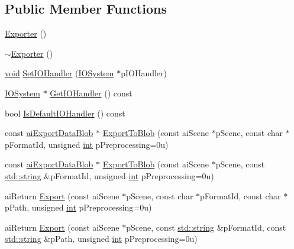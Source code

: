 \subsection*{Public Member Functions}
\begin{DoxyCompactItemize}
\item 
\hyperlink{class_assimp_1_1_exporter_ac45a55fc178256576d2d21b58bd944a0}{Exporter} ()
\item 
\hyperlink{class_assimp_1_1_exporter_a52c3ba6c76c778fb5dd70ad30589fb2c}{$\sim$\-Exporter} ()
\item 
\hyperlink{_s_d_l__opengl_8h_a3db05964a3cc4410f35b7ea2b7eb850d}{void} \hyperlink{class_assimp_1_1_exporter_a054201cf78fa352b1281ea8b484f6e3a}{Set\-I\-O\-Handler} (\hyperlink{class_assimp_1_1_i_o_system}{I\-O\-System} $\ast$p\-I\-O\-Handler)
\item 
\hyperlink{class_assimp_1_1_i_o_system}{I\-O\-System} $\ast$ \hyperlink{class_assimp_1_1_exporter_a736d66db1a94de7df6eb978975e8d47a}{Get\-I\-O\-Handler} () const 
\item 
bool \hyperlink{class_assimp_1_1_exporter_a9ae1196f04cceb0d35fde6229ba41d0b}{Is\-Default\-I\-O\-Handler} () const 
\item 
const \hyperlink{structai_export_data_blob}{ai\-Export\-Data\-Blob} $\ast$ \hyperlink{class_assimp_1_1_exporter_a390c0950a3a164fc431e0797ae1a84d1}{Export\-To\-Blob} (const ai\-Scene $\ast$p\-Scene, const char $\ast$p\-Format\-Id, unsigned \hyperlink{_s_d_l__thread_8h_a6a64f9be4433e4de6e2f2f548cf3c08e}{int} p\-Preprocessing=0u)
\item 
const \hyperlink{structai_export_data_blob}{ai\-Export\-Data\-Blob} $\ast$ \hyperlink{class_assimp_1_1_exporter_a02aa8c453879dc9365e7ec4d1e8d7413}{Export\-To\-Blob} (const ai\-Scene $\ast$p\-Scene, const \hyperlink{_s_d_l__opengl_8h_a4643b88e2349494c65861169f8944eca}{std\-::string} \&p\-Format\-Id, unsigned \hyperlink{_s_d_l__thread_8h_a6a64f9be4433e4de6e2f2f548cf3c08e}{int} p\-Preprocessing=0u)
\item 
ai\-Return \hyperlink{class_assimp_1_1_exporter_ab8edf249172567a78ca302278a415e35}{Export} (const ai\-Scene $\ast$p\-Scene, const char $\ast$p\-Format\-Id, const char $\ast$p\-Path, unsigned \hyperlink{_s_d_l__thread_8h_a6a64f9be4433e4de6e2f2f548cf3c08e}{int} p\-Preprocessing=0u)
\item 
ai\-Return \hyperlink{class_assimp_1_1_exporter_aec681d38ca0bef85a015c64831a3566a}{Export} (const ai\-Scene $\ast$p\-Scene, const \hyperlink{_s_d_l__opengl_8h_a4643b88e2349494c65861169f8944eca}{std\-::string} \&p\-Format\-Id, const \hyperlink{_s_d_l__opengl_8h_a4643b88e2349494c65861169f8944eca}{std\-::string} \&p\-Path, unsigned \hyperlink{_s_d_l__thread_8h_a6a64f9be4433e4de6e2f2f548cf3c08e}{int} p\-Preprocessing=0u)

\end{DoxyCompactItemize}
